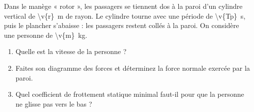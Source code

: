 Dans le manège « rotor », les passagers se tiennent dos à la paroi d'un cylindre vertical de \qty{\v{r}}{m} de rayon. Le cylindre tourne avec une période de \qty{\v{Tp}}{s}, puis le plancher s'abaisse : les passagers restent collés à la paroi. On considère une personne de \qty{\v{m}}{kg}.

\begin{enumerate}[label=\alph*)]
    \item Quelle est la vitesse de la personne ?
    \item Faites son diagramme des forces et déterminez la force normale exercée par la paroi.
    \item Quel coefficient de frottement statique minimal faut-il pour que la personne ne glisse pas vers le bas ?
\end{enumerate}
